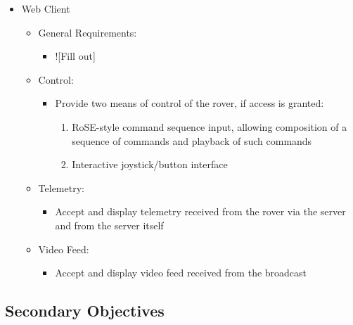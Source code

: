 \begin{itemize}
        \item Web Client
        \begin{itemize}
          \item General Requirements:
          \begin{itemize}
            \item ![Fill out]
          \end{itemize}
          \item Control:
          \begin{itemize}
            \item Provide two means of control of the rover, if access is granted:
            \begin{enumerate}
              \item RoSE-style command sequence input, allowing composition of a sequence of commands and playback of such commands
              \item Interactive joystick/button interface
            \end{enumerate}
          \end{itemize}
          \item Telemetry:
          \begin{itemize}
            \item Accept and display telemetry received from the rover via the server and from the server itself
          \end{itemize}
          \item Video Feed:
          \begin{itemize}
            \item Accept and display video feed received from the broadcast
          \end{itemize}
        \end{itemize}
      \end{itemize}
    
    
  
  \subsection{Secondary Objectives}
  \label{sec:secondary-objectives}